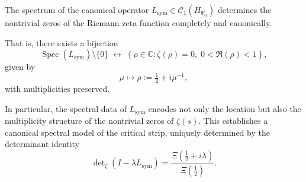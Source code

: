 \begin{corollary}
\label{cor:spectral_determines_zeta}
The spectrum of the canonical operator \( L_{\mathrm{sym}} \in \mathcal{C}_1(H_{\Psi_\alpha}) \) determines the nontrivial zeros of the Riemann zeta function completely and canonically.

That is, there exists a bijection
\[
\operatorname{Spec}(L_{\mathrm{sym}}) \setminus \{0\}
\;\longleftrightarrow\;
\left\{ \rho \in \mathbb{C} : \zeta(\rho) = 0, \; 0 < \Re(\rho) < 1 \right\},
\]
given by
\[
\mu \mapsto \rho := \tfrac{1}{2} + i \mu^{-1},
\]
with multiplicities preserved.

\medskip
\noindent
In particular, the spectral data of \( L_{\mathrm{sym}} \) encodes not only the location but also the multiplicity structure of the nontrivial zeros of \( \zeta(s) \). This establishes a canonical spectral model of the critical strip, uniquely determined by the determinant identity
\[
\det\nolimits_\zeta(I - \lambda L_{\mathrm{sym}}) = \frac{\Xi\left( \tfrac{1}{2} + i\lambda \right)}{\Xi\left( \tfrac{1}{2} \right)}.
\]
\end{corollary}
